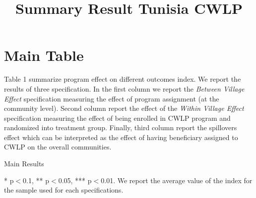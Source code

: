 \documentclass[10pt,a4paper]{article}
\begin{document}
	
	\title{Summary Result Tunisia CWLP}\maketitle
	
	\pagebreak
	
	\tableofcontents
	
	\pagebreak
	
\section{Main Table}

Table 1 summarize program effect on different outcomes index. We report the results of three specification. In the first column we report the \textit{Between Village Effect} specification measuring the effect of program assignment (at the community level). Second column report the effect of the \textit{Within Village Effect} specification measuring the effect of being enrolled in CWLP program and randomized into treatment group. Finally, third column report the spillovers effect which can be interpreted as the effect of having beneficiary assigned to CWLP on the overall communities. \\




\begin{table}[H]\centering\caption{Main Results} 
	\resizebox{\textwidth}{!}{}\caption*{\footnotesize{* p$<$0.1, ** p$<$0.05, *** p$<$0.01. We report the average value of the index for the sample used for each specifications.}}
\end{table}
\end{document}
